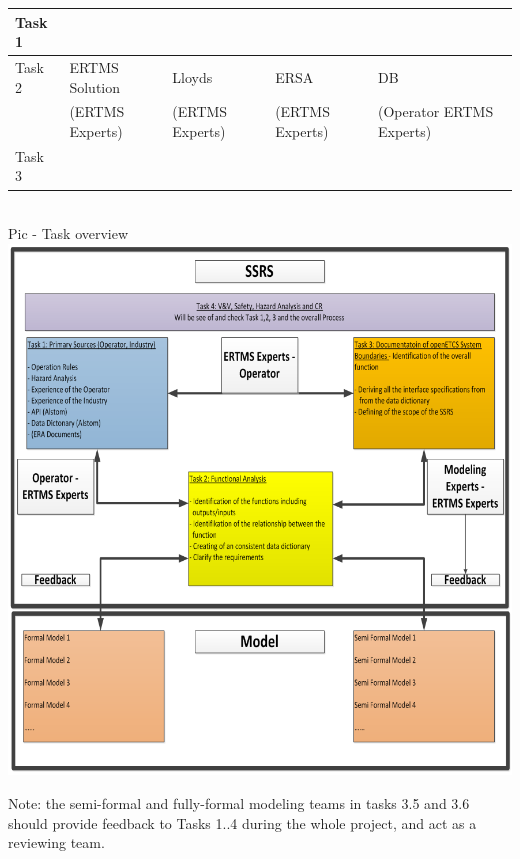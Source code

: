 \documentclass{template/openetcs_article}
\begin{document}
\begin{tabular}{|  l || l | l | l | l | }
    \hline
    Task 1 &  &  & & \\ \hline
    Task 2 & ERTMS Solution & Lloyds&ERSA &DB \\ 
     & (ERTMS Experts) & (ERTMS Experts) & (ERTMS Experts) & (Operator
ERTMS Experts)
\\ \hline
    Task 3 &  &  & & \\ \hline
    \hline
  \end{tabular}
  \newline
  \\
    Pic  - Task overview
    \newline
  \includegraphics[width=15cm]{figs/task_overview}
  
  Note: the semi-formal and fully-formal modeling teams in tasks 3.5 and 3.6 should provide feedback to Tasks 1..4 during the whole project, and act as a reviewing team.
\end{document}
